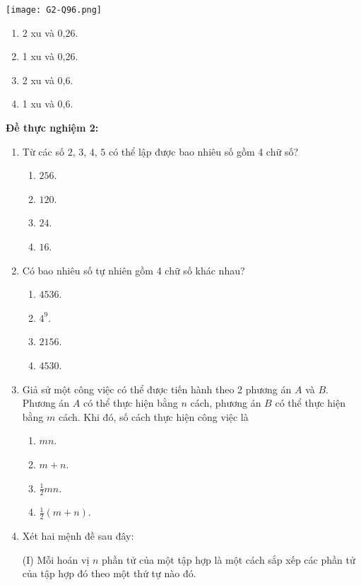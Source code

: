 \begin{enumerate}[label=\textbf{Câu \arabic*.},align=left,left=0cm..0cm,itemindent=*]
	{\centering\texttt{[image: G2-Q96.png]}\par}
	\begin{enumerate}[label=\textbf{\Alph*.},align=left,left=1cm..0cm,itemindent=*]
		\item 2 xu và 0,26. \item 1 xu và 0,26. \item 2 xu và 0,6. \item 1 xu và 0,6.
	\end{enumerate}
\end{enumerate}

\noindent\textbf{Đề thực nghiệm 2:}
\begin{enumerate}[label=\textbf{Câu \arabic*.},align=left,left=0cm..0cm,itemindent=*]
	\item Từ các số $2$, $3$, $4$, $5$ có thể lập được bao nhiêu số gồm 4 chữ số?
	\begin{enumerate}[label=\textbf{\Alph*.},align=left,left=1cm..0cm,itemindent=*]
		\item $256$. \item $120$. \item $24$. \item $16$.
	\end{enumerate}
	\item Có bao nhiêu số tự nhiên gồm 4 chữ số khác nhau?
	\begin{enumerate}[label=\textbf{\Alph*.},align=left,left=1cm..0cm,itemindent=*]
		\item $4536$. \item $4^9$. \item $2156$. \item $4530$.
	\end{enumerate}
	\item Giả sử một công việc có thể được tiến hành theo 2 phương án $A$ và $B$. Phương án $A$ có thể thực hiện bằng $n$ cách, phương án $B$ có thể thực hiện bằng $m$ cách. Khi đó, số cách thực hiện công việc là
	\begin{enumerate}[label=\textbf{\Alph*.},align=left,left=1cm..0cm,itemindent=*]
		\item $mn$.
		\item $m+n$.
		\item $\frac 12mn$.
		\item $\frac 12(m+n)$.
	\end{enumerate}
	\item Xét hai mệnh đề sau đây:\par
	(I) Mỗi hoán vị $n$ phần tử của một tập hợp là một cách sắp xếp các phần tử của tập hợp đó theo một thứ tự nào đó.\par

\end{enumerate}

